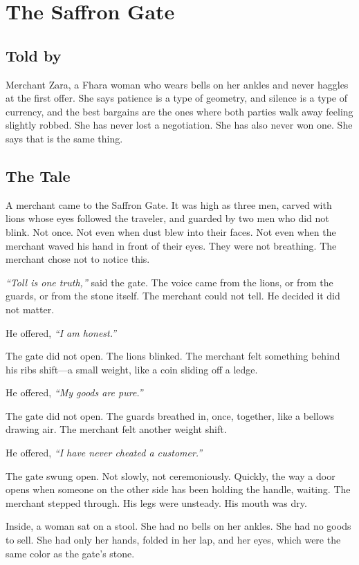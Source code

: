 \chapter{The Saffron Gate}

\section*{Told by}
Merchant Zara, a Fhara woman who wears bells on her ankles and never haggles at the first offer. She says patience is a type of geometry, and silence is a type of currency, and the best bargains are the ones where both parties walk away feeling slightly robbed. She has never lost a negotiation. She has also never won one. She says that is the same thing.

\section*{The Tale}

A merchant came to the Saffron Gate. It was high as three men, carved with lions whose eyes followed the traveler, and guarded by two men who did not blink. Not once. Not even when dust blew into their faces. Not even when the merchant waved his hand in front of their eyes. They were not breathing. The merchant chose not to notice this.

\textit{``Toll is one truth,''} said the gate. The voice came from the lions, or from the guards, or from the stone itself. The merchant could not tell. He decided it did not matter.

He offered, \textit{``I am honest.''}

The gate did not open. The lions blinked. The merchant felt something behind his ribs shift---a small weight, like a coin sliding off a ledge.

He offered, \textit{``My goods are pure.''}

The gate did not open. The guards breathed in, once, together, like a bellows drawing air. The merchant felt another weight shift.

He offered, \textit{``I have never cheated a customer.''}

The gate swung open. Not slowly, not ceremoniously. Quickly, the way a door opens when someone on the other side has been holding the handle, waiting. The merchant stepped through. His legs were unsteady. His mouth was dry.

Inside, a woman sat on a stool. She had no bells on her ankles. She had no goods to sell. She had only her hands, folded in her lap, and her eyes, which were the same color as the gate's stone.

